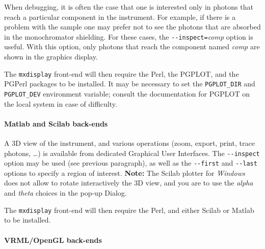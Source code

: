 When debugging, it is often the case that one is interested only in
photons that reach a particular component in the instrument. For
example, if there is a problem with the sample one may prefer not to see
the photons that are absorbed in the monochromator shielding. For these
cases, the \verb+--inspect=+\textit{comp\/} option is useful. With this
option, only photons that reach the component named \textit{comp\/} are
shown in the graphics display.


The \verb+mxdisplay+ front-end will then require the Perl, the PGPLOT, and the
PGPerl packages to be installed. It may be necessary to set the
\verb+PGPLOT_DIR+ and \verb+PGPLOT_DEV+ environment variable; consult the
documentation for PGPLOT on the local system in case of difficulty.
  

\paragraph{Matlab and Scilab back-ends}

A 3D view of the instrument, and various operations (zoom, export, print, trace photons, \ldots) is available from dedicated Graphical User Interfaces.
The \verb+--inspect+ option may be used (see previous paragraph), as well as the \verb+--first+ and \verb+--last+ options to specify a region of interest. {\bfseries Note:} The Scilab plotter for \emph{Windows} does not allow to rotate interactively the 3D view, and you are to use the \emph{alpha} and \emph{theta} choices in the pop-up Dialog.

The \verb+mxdisplay+ front-end will then
require the Perl, and either Scilab or Matlab to be installed.  

\paragraph{VRML/OpenGL back-ends}

